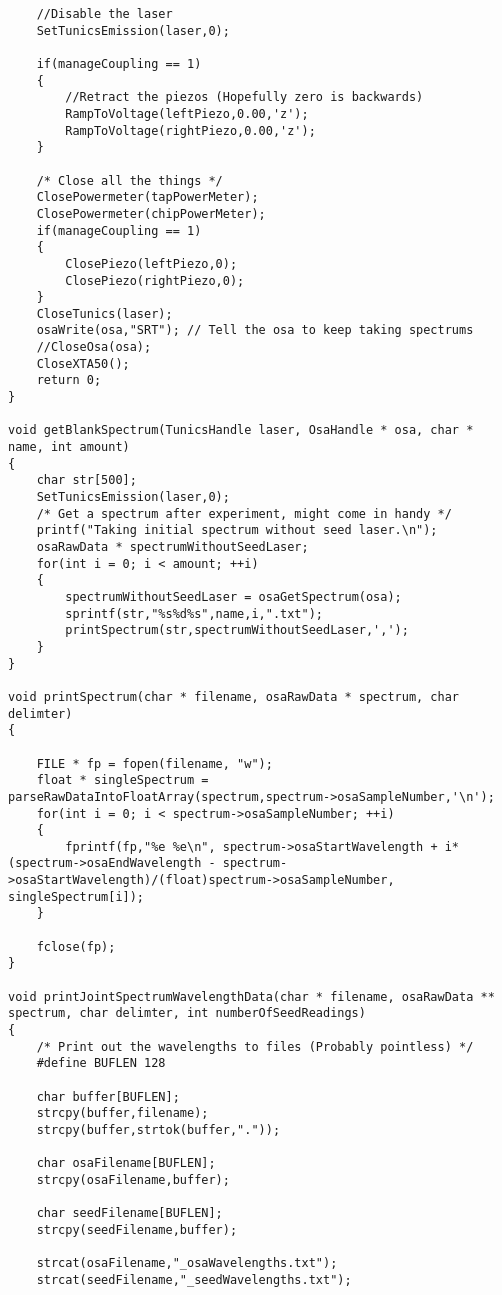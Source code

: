 \begin{lstlisting}
    //Disable the laser
    SetTunicsEmission(laser,0);

    if(manageCoupling == 1)
    {
        //Retract the piezos (Hopefully zero is backwards)
        RampToVoltage(leftPiezo,0.00,'z');
        RampToVoltage(rightPiezo,0.00,'z');
    }

    /* Close all the things */
    ClosePowermeter(tapPowerMeter);
    ClosePowermeter(chipPowerMeter);
    if(manageCoupling == 1)
    {
        ClosePiezo(leftPiezo,0);
        ClosePiezo(rightPiezo,0);
    }
    CloseTunics(laser);
    osaWrite(osa,"SRT"); // Tell the osa to keep taking spectrums
    //CloseOsa(osa);
    CloseXTA50();
    return 0;
}

void getBlankSpectrum(TunicsHandle laser, OsaHandle * osa, char * name, int amount)
{
    char str[500];
    SetTunicsEmission(laser,0);
    /* Get a spectrum after experiment, might come in handy */
    printf("Taking initial spectrum without seed laser.\n");
    osaRawData * spectrumWithoutSeedLaser;
    for(int i = 0; i < amount; ++i)
    {
        spectrumWithoutSeedLaser = osaGetSpectrum(osa);
        sprintf(str,"%s%d%s",name,i,".txt");
        printSpectrum(str,spectrumWithoutSeedLaser,',');
    }
}

void printSpectrum(char * filename, osaRawData * spectrum, char delimter)
{

    FILE * fp = fopen(filename, "w");
    float * singleSpectrum = parseRawDataIntoFloatArray(spectrum,spectrum->osaSampleNumber,'\n');
    for(int i = 0; i < spectrum->osaSampleNumber; ++i)
    {
        fprintf(fp,"%e %e\n", spectrum->osaStartWavelength + i*(spectrum->osaEndWavelength - spectrum->osaStartWavelength)/(float)spectrum->osaSampleNumber, singleSpectrum[i]);
    }

    fclose(fp);
}

void printJointSpectrumWavelengthData(char * filename, osaRawData ** spectrum, char delimter, int numberOfSeedReadings)
{
    /* Print out the wavelengths to files (Probably pointless) */
    #define BUFLEN 128

    char buffer[BUFLEN];
    strcpy(buffer,filename);
    strcpy(buffer,strtok(buffer,"."));

    char osaFilename[BUFLEN];
    strcpy(osaFilename,buffer);

    char seedFilename[BUFLEN];
    strcpy(seedFilename,buffer);

    strcat(osaFilename,"_osaWavelengths.txt");
    strcat(seedFilename,"_seedWavelengths.txt");


\end{lstlisting}
